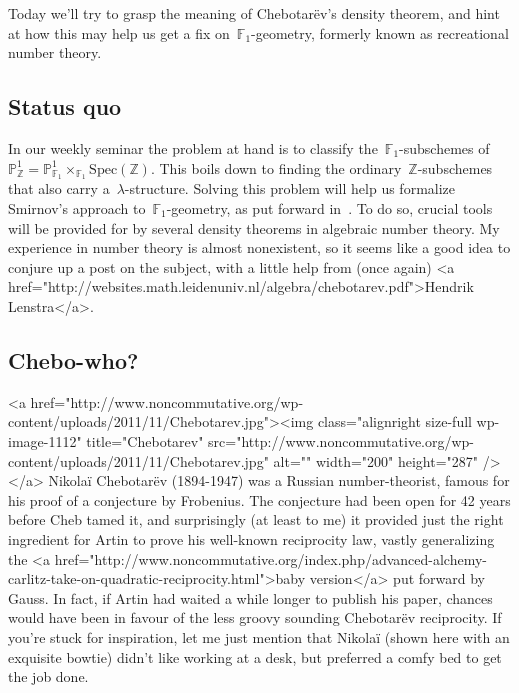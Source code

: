 Today we'll try to grasp the meaning of Chebotar\"ev's density theorem, and hint at how this may help us get a fix on~$\mathbb{F}_{1}$-geometry, formerly known as recreational number theory.

\subsection{Status quo}

In our weekly seminar the problem at hand is to classify the~$\mathbb{F}_{1}$-subschemes of~$\mathbb{P}^{1}_{\mathbb{Z}}=\mathbb{P}^{1}_{\mathbb{F}_{1}}\times_{\mathbb{F}_{1}}\mathrm{Spec}(\mathbb{Z})$. This boils down to finding the ordinary~$\mathbb{Z}$-subschemes that also carry a~$\lambda$-structure. Solving this problem will help us formalize Smirnov's approach to~$\mathbb{F}_{1}$-geometry, as put forward in~\cite{hurwitz-inequalities-for-number-fields}. To do so, crucial tools will be provided for by several density theorems in algebraic number theory. My experience in number theory is almost nonexistent, so it seems like a good idea to conjure up a post on the subject, with a little help from (once again) <a href="http://websites.math.leidenuniv.nl/algebra/chebotarev.pdf">Hendrik Lenstra</a>.

\subsection{Chebo-who?}

<a href="http://www.noncommutative.org/wp-content/uploads/2011/11/Chebotarev.jpg"><img class="alignright size-full wp-image-1112" title="Chebotarev" src="http://www.noncommutative.org/wp-content/uploads/2011/11/Chebotarev.jpg" alt="" width="200" height="287" /></a>
Nikola\"i Chebotar\"ev (1894-1947) was a Russian number-theorist, famous for his proof of a conjecture by Frobenius. The conjecture had been open for 42 years before Cheb tamed it, and surprisingly (at least to me) it provided just the right ingredient for Artin to prove his well-known reciprocity law, vastly generalizing the <a href="http://www.noncommutative.org/index.php/advanced-alchemy-carlitz-take-on-quadratic-reciprocity.html">baby version</a> put forward by Gauss. In fact, if Artin had waited a while longer to publish his paper, chances would have been in favour of the less groovy sounding Chebotar\"ev reciprocity. If you're stuck for inspiration, let me just mention that Nikola\"i (shown here with an exquisite bowtie) didn't like working at a desk, but preferred a comfy bed to get the job done.

